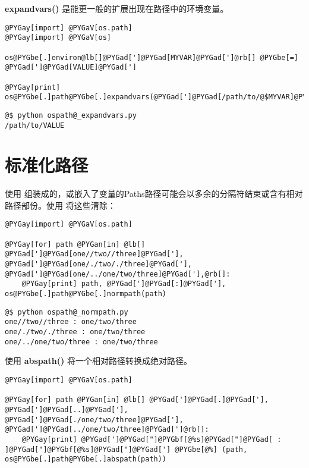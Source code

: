 \documentclass[a4paper,10pt,english]{manual}
\begin{document}
\textbf{expandvars()} 是能更一般的扩展出现在路径中的环境变量。

\begin{Verbatim}[commandchars=@\[\]]
@PYGay[import] @PYGaV[os.path]
@PYGay[import] @PYGaV[os]

os@PYGbe[.]environ@lb[]@PYGad[']@PYGad[MYVAR]@PYGad[']@rb[] @PYGbe[=] @PYGad[']@PYGad[VALUE]@PYGad[']

@PYGay[print] os@PYGbe[.]path@PYGbe[.]expandvars(@PYGad[']@PYGad[/path/to/@$MYVAR]@PYGad['])
\end{Verbatim}

\begin{Verbatim}[commandchars=@\[\]]
@$ python ospath@_expandvars.py
/path/to/VALUE
\end{Verbatim}


\section{标准化路径}

使用  组装成的，或嵌入了变量的Paths路径可能会以多余的分隔符结束或含有相对路径部份。使用  将这些清除：

\begin{Verbatim}[commandchars=@\[\]]
@PYGay[import] @PYGaV[os.path]

@PYGay[for] path @PYGan[in] @lb[] @PYGad[']@PYGad[one//two//three]@PYGad['], @PYGad[']@PYGad[one/./two/./three]@PYGad['], @PYGad[']@PYGad[one/../one/two/three]@PYGad['],@rb[]:
    @PYGay[print] path, @PYGad[']@PYGad[:]@PYGad['], os@PYGbe[.]path@PYGbe[.]normpath(path)
\end{Verbatim}

\begin{Verbatim}[commandchars=@\[\]]
@$ python ospath@_normpath.py
one//two//three : one/two/three
one/./two/./three : one/two/three
one/../one/two/three : one/two/three
\end{Verbatim}

使用 \textbf{abspath()} 将一个相对路径转换成绝对路径。

\begin{Verbatim}[commandchars=@\[\]]
@PYGay[import] @PYGaV[os.path]

@PYGay[for] path @PYGan[in] @lb[] @PYGad[']@PYGad[.]@PYGad['], @PYGad[']@PYGad[..]@PYGad['], @PYGad[']@PYGad[./one/two/three]@PYGad['], @PYGad[']@PYGad[../one/two/three]@PYGad[']@rb[]:
    @PYGay[print] @PYGad[']@PYGad["]@PYGbf[@%s]@PYGad["]@PYGad[ : ]@PYGad["]@PYGbf[@%s]@PYGad["]@PYGad['] @PYGbe[@%] (path, os@PYGbe[.]path@PYGbe[.]abspath(path))
\end{Verbatim}
\end{document}
